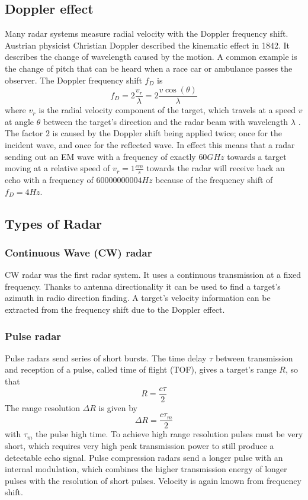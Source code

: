 \subsection{Doppler effect}\label{doppler-effect}

Many radar systems measure radial velocity with the Doppler frequency
shift. Austrian physicist Christian Doppler described the kinematic
effect in 1842. It describes the change of wavelength caused by the
motion. A common example is the change of pitch that can be heard when a
race car or ambulance passes the observer. The Doppler frequency shift
\(f_D\) is \[
f_D = 2 \frac{v_r}{\lambda} = 2 \frac{v \cos ( \theta )}{\lambda}
\] where \(v_r\) is the radial velocity component of the target, which
travels at a speed \(v\) at angle \(\theta\) between the target's
direction and the radar beam with wavelength \(\lambda\)
\cite{Skolnik2008}. The factor \(2\) is caused by the Doppler shift
being applied twice; once for the incident wave, and once for the
reflected wave. In effect this means that a radar sending out an EM wave
with a frequency of exactly \(60GHz\) towards a target moving at a
relative speed of \(v_r = 1\frac{cm}{s}\) towards the radar will receive
back an echo with a frequency of \(60000000004 Hz\) because of the
frequency shift of \(f_D = 4 Hz\).

\subsection{Types of Radar}\label{types-of-radar}

\subsubsection{Continuous Wave (CW) radar}\label{continuous-wave-cw-radar}

CW radar was the first radar system. It uses a continuous transmission
at a fixed frequency. Thanks to antenna directionality it can be used to
find a target's azimuth in radio direction finding. A target's velocity
information can be extracted from the frequency shift due to the Doppler
effect.

\subsubsection{Pulse radar}\label{pulse-radar}

Pulse radars send series of short bursts. The time delay \(\tau\)
between transmission and reception of a pulse, called time of flight
(TOF), gives a target's range \(R\), so that \[ R = \frac{c\tau}{2} \]
The range resolution \(\Delta R\) is given by
\[\Delta R = \frac{c\tau_m}{2}\] with \(\tau_m\) the pulse high time. To
achieve high range resolution pulses must be very short, which requires
very high peak transmission power to still produce a detectable echo
signal. Pulse compression radars send a longer pulse with an internal
modulation, which combines the higher transmission energy of longer
pulses with the resolution of short pulses. Velocity is again known from
frequency shift.

